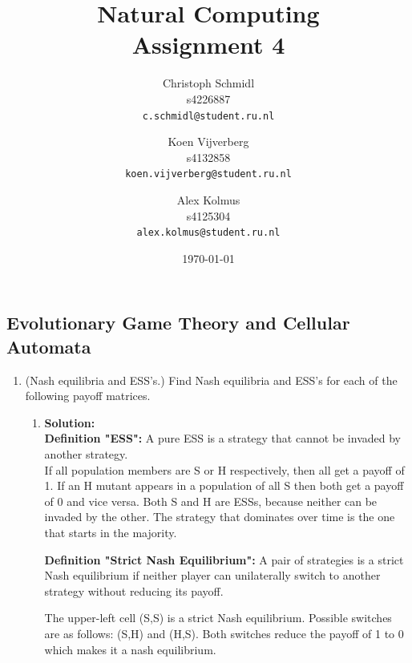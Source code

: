 \documentclass[a4paper]{article}
\title{Natural Computing\\Assignment 4}
\author{
  Christoph Schmidl\\ s4226887\\      \texttt{c.schmidl@student.ru.nl}
  \and
  Koen Vijverberg\\ s4132858\\     \texttt{koen.vijverberg@student.ru.nl}
  \and
  Alex Kolmus\\	s4125304\\	\texttt{alex.kolmus@student.ru.nl}
}
\date{\today}
\begin{document}
\maketitle


\subsection*{Evolutionary Game Theory and Cellular Automata}

\begin{enumerate}

	\item(Nash equilibria and ESS's.) Find Nash equilibria and ESS's for each of the following payoff matrices.
	
	\begin{enumerate}
		\item 
		\begin{minipage}[t]{\linewidth}
          \centering
    \end{minipage}
    \vspace{1em}
		\textbf{Solution:}\\
		
		\textbf{Definition "ESS":} A pure ESS is a strategy that cannot be invaded by another strategy.\\
		
		If all population members are S or H respectively, then all get a payoff of 1. If an H mutant appears in a population of all S then both get a payoff of 0 and vice versa. Both S and H are ESSs, because neither can be invaded by the other. The strategy that dominates over time is the one that starts in the majority.
		\vspace{1em}
		
		\textbf{Definition "Strict Nash Equilibrium":} A pair of strategies is a strict Nash equilibrium if neither player can unilaterally switch to another strategy without reducing its payoff.\vspace{1em}
		
		The upper-left cell (S,S) is a strict Nash equilibrium. Possible switches are as follows: (S,H) and (H,S). Both switches reduce the payoff of 1 to 0 which makes it a nash equilibrium.\\
		

\end{enumerate}
\end{enumerate}
\end{document}
